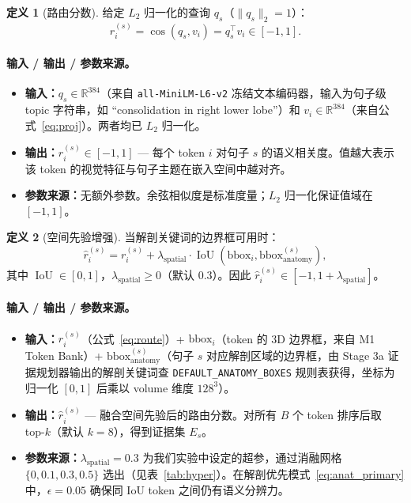 \documentclass[11pt,a4paper]{article}
\newcommand{\RR}{\mathbb{R}}
\newcommand{\IoU}{\operatorname{IoU}}
\newcommand{\cosine}{\operatorname{cos}}
\theoremstyle{definition}
\newtheorem{definition}{定义}[section]
\begin{document}
\begin{definition}[路由分数]
给定 $L_2$ 归一化的查询 $q_s$（$\|q_s\|_2=1$）：
\begin{equation}\label{eq:route}
r_i^{(s)} = \cosine(q_s, v_i) = q_s^\top v_i \in [-1, 1].
\end{equation}

\paragraph{输入 / 输出 / 参数来源。}
\begin{itemize}[nosep]
    \item \textbf{输入：}$q_s \in \RR^{384}$（来自 \texttt{all-MiniLM-L6-v2} 冻结文本编码器，输入为句子级 topic 字符串，如 ``consolidation in right lower lobe''）和 $v_i \in \RR^{384}$（来自公式~\ref{eq:proj}）。两者均已 $L_2$ 归一化。
    \item \textbf{输出：}$r_i^{(s)} \in [-1, 1]$ — 每个 token $i$ 对句子 $s$ 的语义相关度。值越大表示该 token 的视觉特征与句子主题在嵌入空间中越对齐。
    \item \textbf{参数来源：}无额外参数。余弦相似度是标准度量；$L_2$ 归一化保证值域在 $[-1,1]$。
\end{itemize}
\end{definition}

\begin{definition}[空间先验增强]
当解剖关键词的边界框可用时：
\begin{equation}\label{eq:spatial}
\hat{r}_i^{(s)} = r_i^{(s)} + \lambda_{\mathrm{spatial}} \cdot \IoU(\mathrm{bbox}_i, \mathrm{bbox}_{\mathrm{anatomy}}^{(s)}),
\end{equation}
其中 $\IoU \in [0,1]$，$\lambda_{\mathrm{spatial}} \geq 0$（默认 0.3）。因此 $\hat{r}_i^{(s)} \in [-1, 1+\lambda_{\mathrm{spatial}}]$。

\paragraph{输入 / 输出 / 参数来源。}
\begin{itemize}[nosep]
    \item \textbf{输入：}$r_i^{(s)}$（公式~\ref{eq:route}）+ $\mathrm{bbox}_i$（token 的 3D 边界框，来自 M1 Token Bank）+ $\mathrm{bbox}_{\mathrm{anatomy}}^{(s)}$（句子 $s$ 对应解剖区域的边界框，由 Stage 3a 证据规划器输出的解剖关键词查 \texttt{DEFAULT\_ANATOMY\_BOXES} 规则表获得，坐标为归一化 $[0,1]$ 后乘以 volume 维度 $128^3$）。
    \item \textbf{输出：}$\hat{r}_i^{(s)}$ — 融合空间先验后的路由分数。对所有 $B$ 个 token 排序后取 top-$k$（默认 $k=8$），得到证据集 $E_s$。
    \item \textbf{参数来源：}$\lambda_{\mathrm{spatial}} = 0.3$ 为我们实验中设定的超参，通过消融网格 $\{0, 0.1, 0.3, 0.5\}$ 选出（见表~\ref{tab:hyper}）。在解剖优先模式~\eqref{eq:anat_primary} 中，$\epsilon = 0.05$ 确保同 IoU token 之间仍有语义分辨力。
\end{itemize}
\end{definition}
\end{document}
